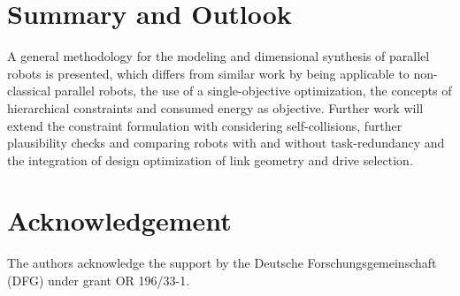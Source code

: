 \documentclass[fleqn,a4paper,10pt]{article}
\begin{document}
\begin{multicols}{2}
\section{Summary and Outlook}
\label{sec:summary}

A general methodology for the modeling and dimensional synthesis of parallel robots is presented, which differs from similar work by being applicable to non-classical parallel robots, the use of a single-objective optimization, the concepts of hierarchical constraints and consumed energy as objective. 
Further work will extend the constraint formulation with considering self-collisions, further plausibility checks and comparing robots with and without task-redundancy and the integration of design optimization of link geometry and drive selection.


\section{Acknowledgement}

The authors acknowledge the support by the Deutsche Forschungsgemeinschaft (DFG) under grant OR 196/33-1.






\end{multicols}
\end{document}
